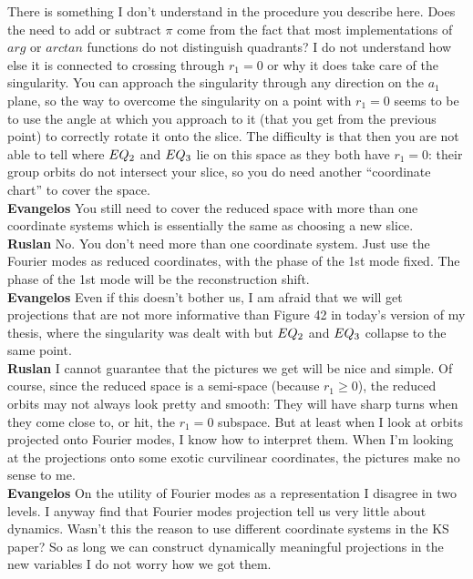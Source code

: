 There is something I don't understand in the procedure you
describe here. Does the need to add or subtract $\pi$ come
from the fact that most implementations of $arg$ or $arctan$
functions do not distinguish quadrants? I do not understand
how else it is connected to crossing through $r_1 = 0$ or why
it does take care of the singularity. You can approach the
singularity through any direction on the $a_1$ plane, so the
way to overcome the singularity on a point with $r_1=0$ seems
to be to use the angle at which you approach to it (that you
get from the previous point) to correctly rotate it onto the
slice. The difficulty is that then you are not able to tell
where $EQ_{2}$ and $EQ_{3}$ lie on this space as they both
have $r_1=0$: their group orbits do not intersect your slice,
so you do need another ``coordinate chart'' to cover the
space.
\\
{\bf Evangelos} You still need to cover the reduced space
with more than one coordinate systems which is essentially
the same as choosing a new slice.\\
{\bf Ruslan} No. You don't need more than one coordinate
system.  Just use the Fourier modes as reduced coordinates,
with the phase of the 1st mode fixed.  The phase of the 1st
mode will be the reconstruction shift.\\
{\bf Evangelos} Even if this doesn't bother us, I am afraid
that we will get projections that are not more informative
than Figure 42 in today's version of my thesis, where the
singularity was dealt with but $EQ_{2}$ and $EQ_{3}$
collapse to the same point.\\
{\bf Ruslan} I cannot guarantee that the pictures we get
will be nice and simple.  Of course, since the reduced space
is a semi-space (because $r_1 \geq 0$), the reduced orbits
may not always look pretty and smooth: They will have sharp
turns when they come close to, or hit, the $r_1 = 0$
subspace.  But at least when I look at orbits projected onto
Fourier modes, I know how to interpret them.  When I'm
looking at the projections onto some exotic curvilinear
coordinates, the pictures make no sense to me.\\
{\bf Evangelos} On the utility of Fourier modes as a
representation I disagree in two levels. I anyway find that
Fourier modes projection tell us very little about dynamics.
Wasn't this the reason to use different coordinate systems in
the KS paper? So as long we can construct dynamically
meaningful projections in the new variables I do not worry
how we got them.

